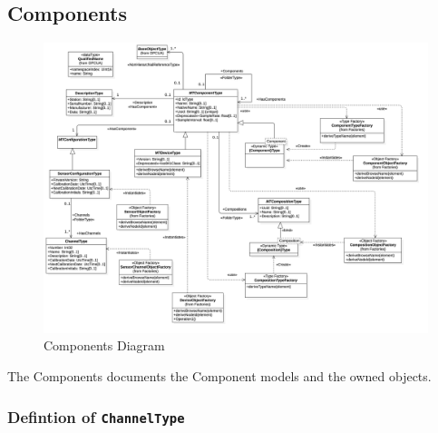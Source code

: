 \subsection{Components}

\begin{figure}
  \centering
    \includegraphics[width=1.0\textwidth]{diagrams/Components.png}
  \caption{Components Diagram}
  \label{fig:Components}
\end{figure}

\FloatBarrier


The Components documents the Component models and the owned objects.

\subsubsection{Defintion of \texttt{ChannelType}} \label{type:ChannelType}

\FloatBarrier



